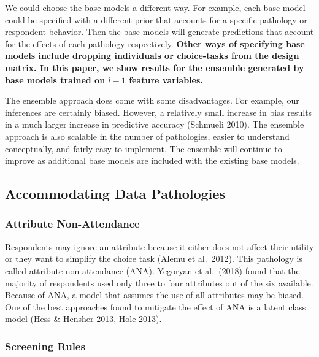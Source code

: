\documentclass[12pt,titlepage]{mktg-article}
\begin{document}
We could choose the base models a different way. For example, each base model could be specified with a different prior that accounts for a specific pathology or respondent behavior. Then the base models will generate predictions that account for the effects of each pathology respectively. \textbf{Other ways of specifying base models include dropping individuals or choice-tasks from the design matrix. In this paper, we show results for the ensemble generated by base models trained on \(l-1\) feature variables.}

The ensemble approach does come with some disadvantages. For example, our inferences are certainly biased. However, a relatively small increase in bias results in a much larger increase in predictive accuracy (Schmueli 2010). The ensemble approach is also scalable in the number of pathologies, easier to understand conceptually, and fairly easy to implement. The ensemble will continue to improve as additional base models are included with the existing base models.

\hypertarget{accommodating-data-pathologies}{%
\subsection{Accommodating Data Pathologies}\label{accommodating-data-pathologies}}

\hypertarget{attribute-non-attendance}{%
\subsubsection{Attribute Non-Attendance}\label{attribute-non-attendance}}

Respondents may ignore an attribute because it either does not affect their utility or they want to simplify the choice task (Alemu et al.~2012). This pathology is called attribute non-attendance (ANA). Yegoryan et al.~(2018) found that the majority of respondents used only three to four attributes out of the six available. Because of ANA, a model that assumes the use of all attributes may be biased. One of the best approaches found to mitigate the effect of ANA is a latent class model (Hess \& Hensher 2013, Hole 2013).

\hypertarget{screening-rules}{%
\subsubsection{Screening Rules}\label{screening-rules}}
\end{document}
